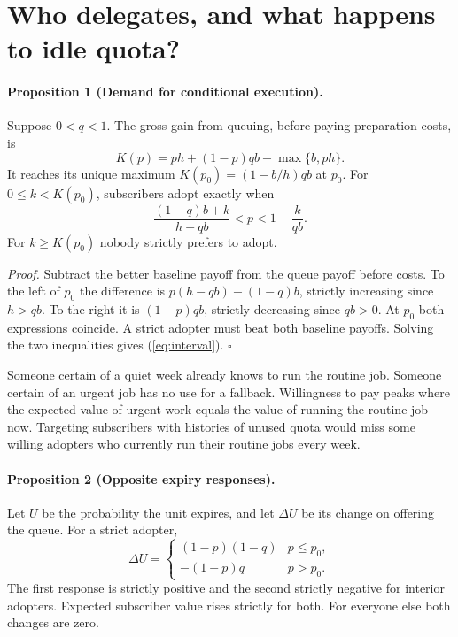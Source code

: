 \documentclass[11pt]{article}
\begin{document}
\section{Who delegates, and what happens to idle quota?}

\paragraph{Proposition 1 (Demand for conditional execution).}
Suppose $0<q<1$. The gross gain from queuing, before paying preparation costs, is
\begin{equation}
K(p)=ph+(1-p)qb-\max\{b,ph\}.
\label{eq:gain}
\end{equation}
It reaches its unique maximum $K(p_0)=(1-b/h)qb$ at $p_0$. For $0\leq k<K(p_0)$, subscribers adopt exactly when
\begin{equation}
  \frac{(1-q)b+k}{h-qb} < p < 1-\frac{k}{qb}.
\label{eq:interval}
\end{equation}
For $k\ge K(p_0)$ nobody strictly prefers to adopt.

\emph{Proof.} Subtract the better baseline payoff from the queue payoff before costs. To the left of $p_0$ the difference is $p(h-qb)-(1-q)b$, strictly increasing since $h>qb$. To the right it is $(1-p)qb$, strictly decreasing since $qb>0$. At $p_0$ both expressions coincide. A strict adopter must beat both baseline payoffs. Solving the two inequalities gives (\ref{eq:interval}). \hfill$\square$

Someone certain of a quiet week already knows to run the routine job. Someone certain of an urgent job has no use for a fallback. Willingness to pay peaks where the expected value of urgent work equals the value of running the routine job now. Targeting subscribers with histories of unused quota would miss some willing adopters who currently run their routine jobs every week.

\paragraph{Proposition 2 (Opposite expiry responses).}
Let $U$ be the probability the unit expires, and let $\Delta U$ be its change on offering the queue. For a strict adopter,
\begin{equation}
\Delta U =
\begin{cases}
(1-p)(1-q) & p\leq p_0,\\
-(1-p)q & p>p_0 .
\end{cases}\label{eq:idle}
\end{equation}
The first response is strictly positive and the second strictly negative for interior adopters. Expected subscriber value rises strictly for both. For everyone else both changes are zero.
\end{document}
